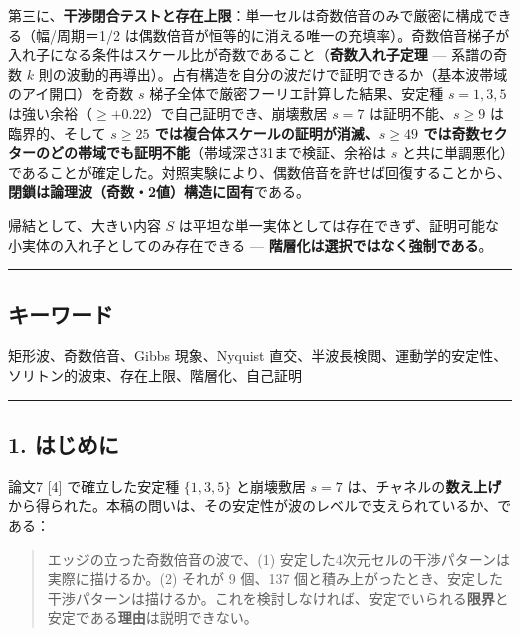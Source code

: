 \documentclass[
]{ltjsarticle}
\begin{document}
第三に、\textbf{干渉閉合テストと存在上限}：単一セルは奇数倍音のみで厳密に構成できる（幅/周期＝1/2
は偶数倍音が恒等的に消える唯一の充填率）。奇数倍音梯子が入れ子になる条件はスケール比が奇数であること（\textbf{奇数入れ子定理}
--- 系譜の奇数 \(k\)
則の波動的再導出）。占有構造を自分の波だけで証明できるか（基本波帯域のアイ開口）を奇数
\(s\) 梯子全体で厳密フーリエ計算した結果、安定種 \(s=1,3,5\)
は強い余裕（\(\ge+0.22\)）で自己証明でき、崩壊敷居 \(s=7\)
は証明不能、\(s\ge9\) は臨界的、そして \textbf{\(s\ge25\)
では複合体スケールの証明が消滅、\(s\ge49\)
では奇数セクターのどの帯域でも証明不能}（帯域深さ31まで検証、余裕は
\(s\)
と共に単調悪化）であることが確定した。対照実験により、偶数倍音を許せば回復することから、\textbf{閉鎖は論理波（奇数・2値）構造に固有}である。

帰結として、大きい内容 \(S\)
は平坦な単一実体としては存在できず、証明可能な小実体の入れ子としてのみ存在できる
--- \textbf{階層化は選択ではなく強制である}。

\begin{center}\rule{0.5\linewidth}{0.5pt}\end{center}

\subsection{キーワード}\label{ux30adux30fcux30efux30fcux30c9}

矩形波、奇数倍音、Gibbs 現象、Nyquist
直交、半波長検閲、運動学的安定性、ソリトン的波束、存在上限、階層化、自己証明

\begin{center}\rule{0.5\linewidth}{0.5pt}\end{center}

\subsection{1. はじめに}\label{ux306fux3058ux3081ux306b}

論文7 {[}4{]} で確立した安定種 \(\{1,3,5\}\) と崩壊敷居 \(s=7\)
は、チャネルの\textbf{数え上げ}から得られた。本稿の問いは、その安定性が波のレベルで支えられているか、である：

\begin{quote}
エッジの立った奇数倍音の波で、(1)
安定した4次元セルの干渉パターンは実際に描けるか。(2) それが 9 個、137
個と積み上がったとき、安定した干渉パターンは描けるか。これを検討しなければ、安定でいられる\textbf{限界}と安定である\textbf{理由}は説明できない。
\end{quote}
\end{document}
